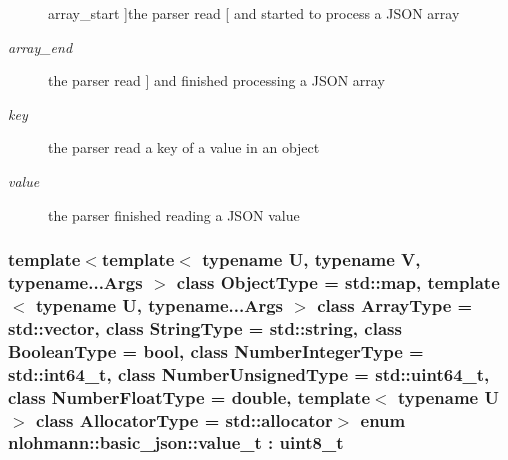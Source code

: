 \begin{Desc}
\begin{description}
{\hypertarget{classnlohmann_1_1basic__json_aea1c863b719b4ca5b77188c171bbfafeaa4388a3d92419edbb1c6efd4d52461f3}{array\-\_\-start}\label{classnlohmann_1_1basic__json_aea1c863b719b4ca5b77188c171bbfafeaa4388a3d92419edbb1c6efd4d52461f3}
}]the parser read {\ttfamily \mbox{[}} and started to process a J\-S\-O\-N array \item[{\em 
\hypertarget{classnlohmann_1_1basic__json_aea1c863b719b4ca5b77188c171bbfafea49642fb732aa2e112188fba1f9d3ef7f}{array\-\_\-end}\label{classnlohmann_1_1basic__json_aea1c863b719b4ca5b77188c171bbfafea49642fb732aa2e112188fba1f9d3ef7f}
}]the parser read {\ttfamily \mbox{]}} and finished processing a J\-S\-O\-N array \item[{\em 
\hypertarget{classnlohmann_1_1basic__json_aea1c863b719b4ca5b77188c171bbfafea3c6e0b8a9c15224a8228b9a98ca1531d}{key}\label{classnlohmann_1_1basic__json_aea1c863b719b4ca5b77188c171bbfafea3c6e0b8a9c15224a8228b9a98ca1531d}
}]the parser read a key of a value in an object \item[{\em 
\hypertarget{classnlohmann_1_1basic__json_aea1c863b719b4ca5b77188c171bbfafea2063c1608d6e0baf80249c42e2be5804}{value}\label{classnlohmann_1_1basic__json_aea1c863b719b4ca5b77188c171bbfafea2063c1608d6e0baf80249c42e2be5804}
}]the parser finished reading a J\-S\-O\-N value \end{description}
\end{Desc}
\hypertarget{classnlohmann_1_1basic__json_a231b02148577b69a154b2ce2c87a5522}{
\subsubsection[{value\-\_\-t}]{\setlength{\rightskip}{0pt plus 5cm}template$<$template$<$ typename U, typename V, typename...\-Args $>$ class Object\-Type = std\-::map, template$<$ typename U, typename...\-Args $>$ class Array\-Type = std\-::vector, class String\-Type  = std\-::string, class Boolean\-Type  = bool, class Number\-Integer\-Type  = std\-::int64\-\_\-t, class Number\-Unsigned\-Type  = std\-::uint64\-\_\-t, class Number\-Float\-Type  = double, template$<$ typename U $>$ class Allocator\-Type = std\-::allocator$>$ enum {\bf nlohmann\-::basic\-\_\-json\-::value\-\_\-t} \-: uint8\-\_\-t\hspace{0.3cm}{\ttfamily [strong]}}}\label{classnlohmann_1_1basic__json_a231b02148577b69a154b2ce2c87a5522}


